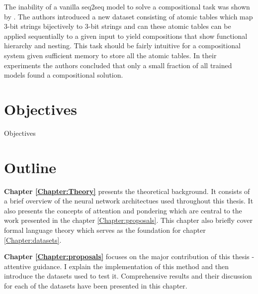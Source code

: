 The inability of a vanilla seq2seq model to solve a compositional task was shown by \cite{Liska2018}. The authors introduced a new dataset consisting of atomic tables which map 3-bit strings bijectively to 3-bit strings and can these atomic tables can be applied sequentially to a given input to yield compositions that show functional hierarchy and nesting. This task should be fairly intuitive for a compositional system given sufficient memory to store all the atomic tables. In their experiments the authors concluded that only a small fraction of all trained models found a compositional solution.


		
\section{Objectives}
	Objectives

	
\section{Outline}
	\textbf{Chapter \ref{Chapter:Theory}} presents the theoretical background. It consists of a brief overview of the neural network architectues used throughout this thesis. It also presents the concepts of attention and pondering which are central to the work presented in the chapter \ref{Chapter:proposals}. This chapter also briefly cover formal language theory which serves as the foundation for chapter \ref{Chapter:datasets}.
	
	\textbf{Chapter \ref{Chapter:proposals}} focuses on the major contribution of this thesis - attentive guidance. I explain the implementation of this method and then introduce the datasets used to test it. Comprehensive results and their discussion for each of the datasets have been presented in this chapter.
	
